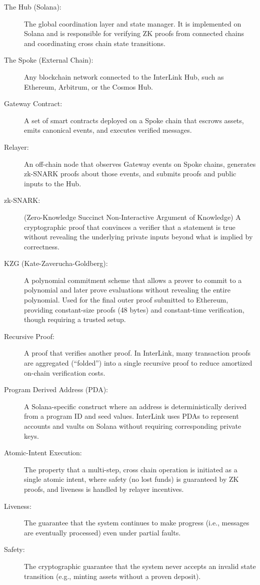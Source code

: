 \documentclass[11pt,a4paper]{article}
\begin{document}
\begin{description}
    \item[The Hub (Solana):] The global coordination layer and state manager. It is implemented on Solana and is responsible for verifying ZK proofs from connected chains and coordinating cross chain state transitions.
    \item[The Spoke (External Chain):] Any blockchain network connected to the InterLink Hub, such as Ethereum, Arbitrum, or the Cosmos Hub.
    \item[Gateway Contract:] A set of smart contracts deployed on a Spoke chain that escrows assets, emits canonical events, and executes verified messages.
    \item[Relayer:] An off-chain node that observes Gateway events on Spoke chains, generates zk-SNARK proofs about those events, and submits proofs and public inputs to the Hub.
    \item[zk-SNARK:] (Zero-Knowledge Succinct Non-Interactive Argument of Knowledge) A cryptographic proof that convinces a verifier that a statement is true without revealing the underlying private inputs beyond what is implied by correctness.
    \item[KZG (Kate-Zaverucha-Goldberg):] A polynomial commitment scheme that allows a prover to commit to a polynomial and later prove evaluations without revealing the entire polynomial. Used for the final outer proof submitted to Ethereum, providing constant-size proofs (48 bytes) and constant-time verification, though requiring a trusted setup.
    \item[Recursive Proof:] A proof that verifies another proof. In InterLink, many transaction proofs are aggregated (``folded'') into a single recursive proof to reduce amortized on-chain verification costs.
    \item[Program Derived Address (PDA):] A Solana-specific construct where an address is deterministically derived from a program ID and seed values. InterLink uses PDAs to represent accounts and vaults on Solana without requiring corresponding private keys.
    \item[Atomic-Intent Execution:] The property that a multi-step, cross chain operation is initiated as a single atomic intent, where safety (no lost funds) is guaranteed by ZK proofs, and liveness is handled by relayer incentives.
    \item[Liveness:] The guarantee that the system continues to make progress (i.e., messages are eventually processed) even under partial faults.
    \item[Safety:] The cryptographic guarantee that the system never accepts an invalid state transition (e.g., minting assets without a proven deposit).
\end{description}
\end{document}

